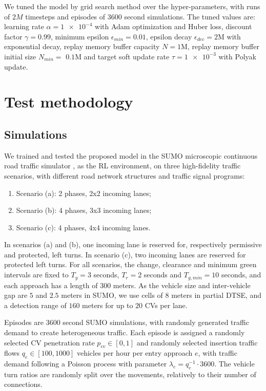 \documentclass[journal]{IEEEtran}
\begin{document}
We tuned the model by grid search method over the hyper-parameters, with runs of $2M$ timesteps and episodes of 3600 second simulations. The tuned values are: learning rate $\alpha=\num{1e-4}$ with Adam optimization and Huber loss, discount factor $\gamma=0.99$, minimum epsilon $\epsilon_{min}=0.01$, epsilon decay $\epsilon_{dec}=2$M with exponential decay, replay memory buffer capacity $N=1$M, replay memory buffer initial size $N_{min}=$ $0.1$M and target soft update rate $\tau=\num{1e-3}$ with Polyak update.

\section{Test methodology}
\label{sec:methodology}

\subsection{Simulations}

We trained and tested the proposed model in the SUMO microscopic continuous road traffic simulator \cite{krajzewicz2012recent,kheterpal2018flow}, as the RL environment, on three high-fidelity traffic scenarios, with different road network structures and traffic signal programs:
\begin{enumerate}
  \item Scenario (a): 2 phases, 2x2 incoming lanes;
  \item Scenario (b): 4 phases, 3x3 incoming lanes;
  \item Scenario (c): 4 phases, 4x4 incoming lanes.
\end{enumerate}

In scenarios (a) and (b), one incoming lane is reserved for, respectively permissive and protected, left turns. In scenario (c), two incoming lanes are reserved for protected left turns. For all scenarios, the change, clearance and minimum green intervals are fixed to $T_y = 3$ seconds, $T_r = 2$ seconds and $T_{g,min} = 10$ seconds, and each approach has a length of $300$ meters. As the vehicle size and inter-vehicle gap are $5$ and $2.5$ meters in SUMO, we use cells of $8$ meters in partial DTSE, and a detection range of $160$ meters for up to $20$ CVs per lane. 

Episodes are 3600 second SUMO simulations, with randomly generated traffic demand to create heterogeneous traffic. Each episode is assigned a randomly selected CV penetration rate $p_{cv} \in [0,1]$ and randomly selected insertion traffic flows $q_e \in [100,1000]$ vehicles per hour per entry approach $e$, with traffic demand following a Poisson process with parameter $\lambda_e = q_e^{-1}\cdot 3600$. The vehicle turn ratios are randomly split over the movements, relatively to their number of connections. 
\end{document}

